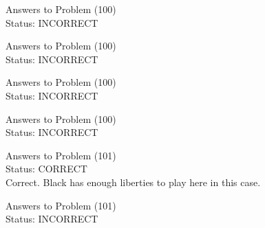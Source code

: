 \documentclass[11pt]{article}
\begin{document}
\begin{minipage}[t]{0.5\textwidth}
  {\centering
  
  Answers to Problem (100)\\
  Status: INCORRECT\\
  
  }
\end{minipage}
\begin{minipage}[t]{0.5\textwidth}
  {\centering
  
  Answers to Problem (100)\\
  Status: INCORRECT\\
  
  }
\end{minipage}
\begin{minipage}[t]{0.5\textwidth}
  {\centering
  
  Answers to Problem (100)\\
  Status: INCORRECT\\
  
  }
\end{minipage}
\begin{minipage}[t]{0.5\textwidth}
  {\centering
  
  Answers to Problem (100)\\
  Status: INCORRECT\\
  
  }
\end{minipage}
\begin{minipage}[t]{0.5\textwidth}
  {\centering
  
  Answers to Problem (101)\\
  Status: CORRECT\\
  Correct. Black has enough liberties to play here in this case.\\
  }
\end{minipage}
\begin{minipage}[t]{0.5\textwidth}
  {\centering
  
  Answers to Problem (101)\\
  Status: INCORRECT\\
  
  }
\end{minipage}
\end{document}
